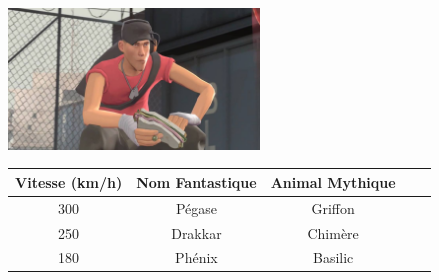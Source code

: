 \documentclass[10pt,a4paper]{scrartcl}
\begin{document}
\includegraphics[width=0.5\textwidth]{scout_tf2}\label{scout}
\begin{table}[]
\begin{tabular}{|@{}c|c|cll@{}|}
\toprule
Vitesse (km/h) & Nom Fantastique & Animal Mythique &  &  \\ \midrule
300            & Pégase          & Griffon         &  &  \\
250            & Drakkar         & Chimère         &  &  \\
180            & Phénix          & Basilic         &  &  \\ \bottomrule
\end{tabular}
\end{table}
\end{document}
